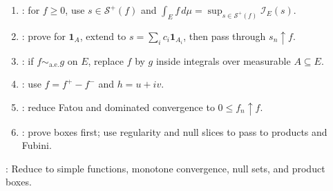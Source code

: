 \begin{method} \label{meth:lebesgue-product-proof-patterns-source-todo} 
\begin{enumerate}[label=(\roman*)]
\setlength{\itemsep}{0pt}
\item {}: for $f\geq0$, use $s\in\mathcal{S}^+(f)$ and $\int_E f\,d\mu=\sup_{s\in\mathcal{S}^+(f)}\mathcal{I}_E(s)$.
\item {}: prove for $\mathbf{1}_A$, extend to $s=\sum_i c_i\mathbf{1}_{A_i}$, then pass through $s_n\uparrow f$.
\item {}: if $f\sim_{\mathrm{a.e.}}g$ on $E$, replace $f$ by $g$ inside integrals over measurable $A\subseteq E$.
\item {}: use $f=f^+-f^-$ and $h=u+iv$.
\item {}: reduce Fatou and dominated convergence to $0\leq f_n\uparrow f$.
\item {}: prove boxes first; use regularity and null slices to pass to products and Fubini.
\end{enumerate}
: Reduce to simple functions, monotone convergence, null sets, and product boxes.
\end{method}
